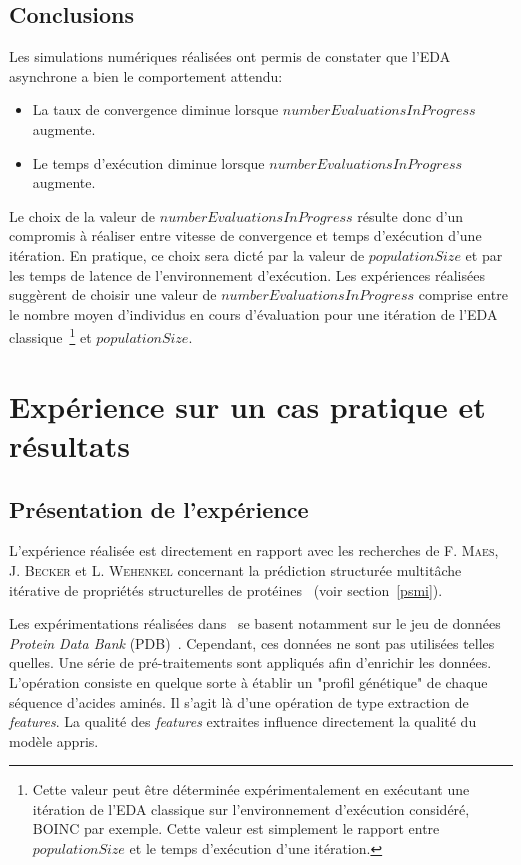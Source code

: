 \documentclass[a4paper, 12pt]{report}
\begin{document}
\subsection{Conclusions}
Les simulations numériques réalisées ont permis de constater que l'EDA asynchrone a bien le comportement attendu:
\begin{itemize}
\item La taux de convergence diminue lorsque $numberEvaluationsInProgress$ augmente.
\item Le temps d'exécution diminue lorsque $numberEvaluationsInProgress$ augmente.
\end{itemize}
Le choix de la valeur de $numberEvaluationsInProgress$ résulte donc d'un compromis à réaliser entre vitesse de convergence et temps d'exécution d'une itération. En pratique, ce choix sera dicté par la valeur de $populationSize$ et par les temps de latence de l'environnement d'exécution. Les expériences réalisées suggèrent de choisir une valeur de $numberEvaluationsInProgress$ comprise entre le nombre moyen d'individus en cours d'évaluation pour une itération de l'EDA classique~\footnote{Cette valeur peut être déterminée expérimentalement en exécutant une itération de l'EDA classique sur l'environnement d'exécution considéré, \textsc{BOINC} par exemple. Cette valeur est simplement le rapport entre $populationSize$ et le temps d'exécution d'une itération.} et $populationSize$.

\section{Expérience sur un cas pratique et résultats}
\label{simupratique}

\subsection{Présentation de l'expérience}
L'expérience réalisée est directement en rapport avec les recherches de F. \textsc{Maes}, J. \textsc{Becker} et L. \textsc{Wehenkel} concernant la prédiction structurée multitâche itérative de propriétés structurelles de protéines~\cite{CAP} (voir section~\ref{psmi}).

Les expérimentations réalisées dans~\cite{CAP} se basent notamment sur le jeu de données \textit{Protein Data Bank} (PDB)~\cite{PDB}. Cependant, ces données ne sont pas utilisées telles quelles. Une série de pré-traitements sont appliqués afin d'enrichir les données. L'opération consiste en quelque sorte à établir un "profil génétique" de chaque séquence d'acides aminés. Il s'agit là d'une opération de type extraction de \textit{features}. La qualité des \textit{features} extraites influence directement la qualité du modèle appris.
\end{document}
